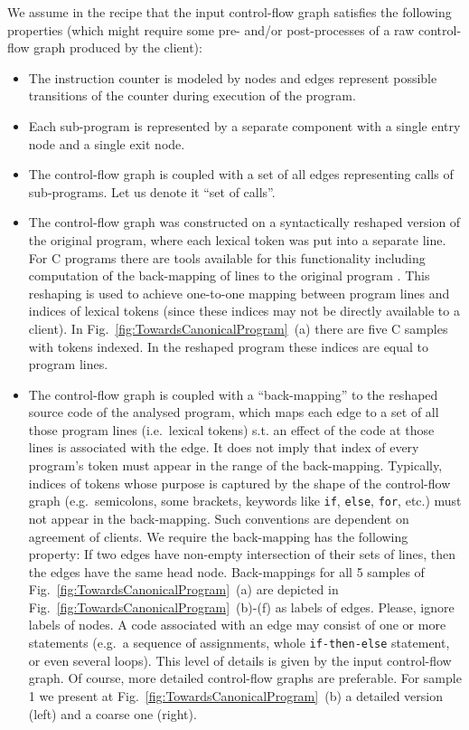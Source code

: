 \documentclass[envcountsame]{llncs}
\begin{document}
We assume in the recipe that the input control-flow graph satisfies the
following properties (which might require some pre- and/or post-processes of a
raw control-flow graph produced by the client):

\begin{itemize}
\item The instruction counter is modeled by nodes and edges represent possible
transitions of the counter during execution of the program. \item Each sub-program is represented by a separate component with a single
entry node and a single exit node. \item The control-flow graph is coupled with a set of all edges representing
calls of sub-programs. Let us denote it ``set of calls''.  \item The control-flow graph was constructed on a syntactically reshaped version
of the original program, where each lexical token was put into a separate line.
For C programs there are tools available for this functionality including
computation of the back-mapping of lines to the original program
\cite{BugstURL,CPAcheckerURL}. This reshaping is used to achieve one-to-one
mapping between program lines and indices of lexical tokens (since these indices
may not be directly available to a client). In
Fig.~\ref{fig:TowardsCanonicalProgram}~(a) there are five C samples with tokens
indexed. In the reshaped program these indices are equal to program lines. \item The control-flow graph is coupled with a ``back-mapping'' to the reshaped
source code of the analysed program, which maps each edge to a set of all those
program lines (i.e.~lexical tokens) s.t. an effect of the code at those lines is
associated with the edge. It does not imply that index of every program's token
must appear in the range of the back-mapping. Typically, indices of tokens whose
purpose is captured by the shape of the control-flow graph (e.g.~semicolons,
some brackets, keywords like \texttt{if}, \texttt{else}, \texttt{for}, etc.)
must not appear in the back-mapping. Such conventions are dependent on agreement
of clients. We require the back-mapping has the following property: If two edges
have non-empty intersection of their sets of lines, then the edges have the same
head node. Back-mappings for all 5 samples of
Fig.~\ref{fig:TowardsCanonicalProgram}~(a) are depicted in
Fig.~\ref{fig:TowardsCanonicalProgram}~(b)-(f) as labels of edges. Please,
ignore labels of nodes. A code associated with an edge may consist of one or
more statements (e.g.~a sequence of assignments, whole \texttt{if-then-else}
statement, or even several loops). This level of details is given by the input
control-flow graph. Of course, more detailed control-flow graphs are preferable.
For sample 1 we present at Fig.~\ref{fig:TowardsCanonicalProgram}~(b) a detailed
version (left) and a coarse one (right). \end{itemize}
\end{document}
